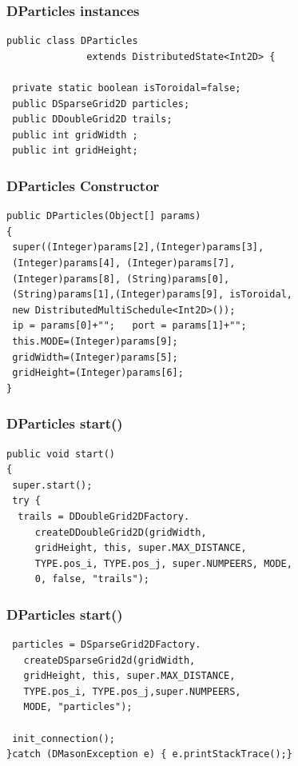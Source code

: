 \documentclass[]{beamer}
\begin{document}
\begin{frame}[fragile]
\frametitle{DParticles instances}
\begin{lstlisting}
public class DParticles
              extends DistributedState<Int2D> {
	
 private static boolean isToroidal=false;
 public DSparseGrid2D particles;
 public DDoubleGrid2D trails;
 public int gridWidth ;
 public int gridHeight;
\end{lstlisting}
\end{frame}

\begin{frame}[fragile]
\frametitle{DParticles Constructor}
\begin{lstlisting}
public DParticles(Object[] params)
{
 super((Integer)params[2],(Integer)params[3],
 (Integer)params[4], (Integer)params[7],
 (Integer)params[8], (String)params[0],
 (String)params[1],(Integer)params[9], isToroidal,
 new DistributedMultiSchedule<Int2D>());
 ip = params[0]+"";   port = params[1]+"";
 this.MODE=(Integer)params[9];
 gridWidth=(Integer)params[5];
 gridHeight=(Integer)params[6];
}
\end{lstlisting}
\end{frame}

\begin{frame}[fragile]
\frametitle{DParticles start()}
\begin{lstlisting}
public void start()
{
 super.start();
 try {
  trails = DDoubleGrid2DFactory.
     createDDoubleGrid2D(gridWidth,
     gridHeight, this, super.MAX_DISTANCE,
     TYPE.pos_i, TYPE.pos_j, super.NUMPEERS, MODE,
     0, false, "trails");
\end{lstlisting}
\end{frame}

\begin{frame}[fragile]
\frametitle{DParticles start()}
\begin{lstlisting}
 particles = DSparseGrid2DFactory.
   createDSparseGrid2d(gridWidth,
   gridHeight, this, super.MAX_DISTANCE,
   TYPE.pos_i, TYPE.pos_j,super.NUMPEERS,
   MODE, "particles");

 init_connection();
}catch (DMasonException e) { e.printStackTrace();}
\end{lstlisting}
\end{frame}
\end{document}
